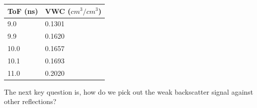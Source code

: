 \documentclass[12pt]{article}
\begin{document}
\begin{table}[]
  \centering
\begin{tabular}{l|l}
\textbf{ToF (ns)} & \textbf{VWC ($cm^3/cm^3$)} \\ \hline
9.0               & 0.1301                                                      \\
9.9              & 0.1620                                                       \\
  10.0              & 0.1657                                                       \\
10.1              & 0.1693                                                       \\
11.0              & 0.2020                                                      
\end{tabular}
\end{table}

The next key question is, how do we pick out the weak backscatter
signal against other reflections?
\end{document}
